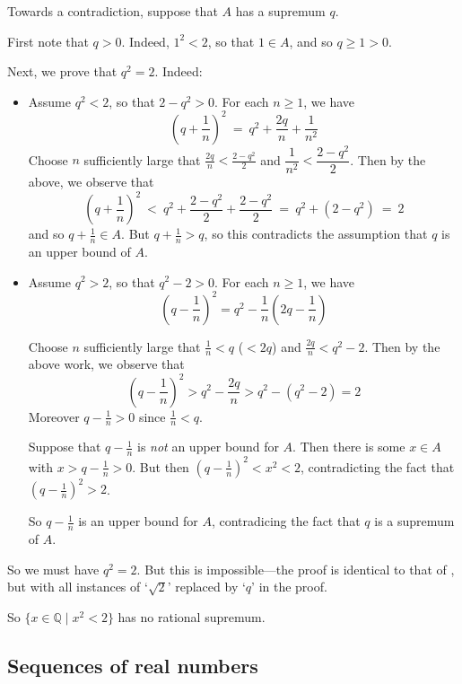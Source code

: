 \begin{cproof}
Towards a contradiction, suppose that $A$ has a supremum $q$.

First note that $q>0$. Indeed, $1^2 < 2$, so that $1 \in A$, and so $q \ge 1 > 0$.

Next, we prove that $q^2 = 2$. Indeed:
\begin{itemize}
\item Assume $q^2 < 2$, so that $2-q^2 > 0$. For each $n \ge 1$, we have
\[ \left( q + \frac{1}{n} \right)^2 ~=~ q^2 + \frac{2q}{n} + \frac{1}{n^2} \]
Choose $n$ sufficiently large that $\frac{2q}{n} < \frac{2-q^2}{2}$ and $\dfrac{1}{n^2} < \dfrac{2-q^2}{2}$. Then by the above, we observe that
\[ \left( q + \frac{1}{n} \right)^2 ~<~ q^2 + \dfrac{2-q^2}{2} + \dfrac{2-q^2}{2} ~=~ q^2 + (2-q^2) ~=~ 2 \]
and so $q+\frac{1}{n} \in A$. But $q + \frac{1}{n} > q$, so this contradicts the assumption that $q$ is an upper bound of $A$.

\item Assume $q^2 > 2$, so that $q^2-2 > 0$. For each $n \ge 1$, we have
\[ \left( q - \frac{1}{n} \right)^2 = q^2 - \frac{1}{n} \left( 2q - \frac{1}{n} \right) \]

Choose $n$ sufficiently large that $\frac{1}{n} < q$ ($< 2q$) and $\frac{2q}{n} < q^2-2$. Then by the above work, we observe that
\[ \left( q - \frac{1}{n} \right)^2 > q^2 - \frac{2q}{n} > q^2 - (q^2-2) = 2 \]
Moreover $q-\frac{1}{n} > 0$ since $\frac{1}{n} < q$.

Suppose that $q-\frac{1}{n}$ is \textit{not} an upper bound for $A$. Then there is some $x \in A$ with $x > q-\frac{1}{n} > 0$. But then $(q-\frac{1}{n})^2 < x^2 < 2$, contradicting the fact that $\left( q-\frac{1}{n} \right)^2 > 2$.

So $q-\frac{1}{n}$ is an upper bound for $A$, contradicing the fact that $q$ is a supremum of $A$.
\end{itemize}

So we must have $q^2 = 2$. But this is impossible---the proof is identical to that of , but with all instances of `$\sqrt{2}$' replaced by `$q$' in the proof.

So $\{ x \in \mathbb{Q} \mid x^2 < 2 \}$ has no rational supremum.
\end{cproof}

\subsection*{Sequences of real numbers}

